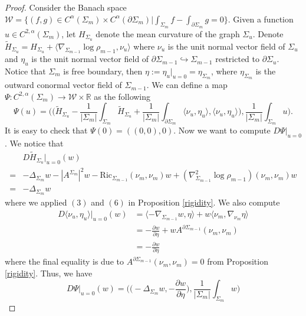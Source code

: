 \documentclass[11pt,letterpaper]{amsart}
\theoremstyle{definition}
\theoremstyle{remark}
\numberwithin{equation}{section}
\begin{document}
\begin{proof}
    Consider the Banach space $\mathcal{W}=\{(f,g)\in C^{\alpha}(\Sigma_{m})\times C^{\alpha}(\partial \Sigma_{m})|\int_{\Sigma_{m}}f-\int_{\partial \Sigma_{m}}g=0\}$. Given a function $u\in C^{2,\alpha}(\Sigma_{m})$, let $H_{\Sigma_u}$ denote the mean curvature of the graph $\Sigma_u$. Denote $\tilde{H}_{\Sigma_{u}}=H_{\Sigma_{u}}+\langle \nabla_{\Sigma_{m-1}}\log\rho_{m-1},\nu_{u}\rangle$ where $\nu_{u}$ is the unit normal vector field of $\Sigma_{u}$ and $\eta
    _{u}$ is the unit normal vector field of $\partial \Sigma_{m-1}\hookrightarrow \Sigma_{m-1}$ restricted to $\partial \Sigma_{u}$. Notice that $\Sigma_{m}$ is free boundary, then $\eta:=\eta_{u}|_{u=0} = \eta_{\Sigma_{m}}$, where $\eta_{\Sigma_{m}}$ is the outward conormal vector field of $\Sigma_{m-1}$. We can define a map $\Psi:C^{2,\alpha}(\Sigma_{m})\rightarrow\mathcal{W}\times \mathbb{R}$ as the following
    \[
    \Psi(u)=\Big(\big(\tilde{H}_{\Sigma_{u}}-\frac{1}{|\Sigma_{m}|}\int_{\Sigma_{m}}\tilde{H}_{\Sigma_{u}}+\frac{1}{|\Sigma_{m}|}\int_{\partial\Sigma_{m}}\langle \nu_{u},\eta_{u}\rangle,\langle\nu_{u},\eta_{u}\rangle\big),\frac{1}{|\Sigma_{m}|}\int_{\Sigma_{m}}u\Big).
    \]
    It is easy to check that $\Psi(0)=((0,0),0)$. Now we want to compute $D\Psi|_{u=0}$. We notice that
    \[
    \begin{aligned}
    &D\tilde{H}_{\Sigma_{u}}|_{u=0}(w)\\
    =&-\Delta_{\Sigma_{m}}w-|A^{\Sigma_{m}}|^2w-\text{Ric}_{\Sigma_{m-1}}(\nu_{m},\nu_{m})w+(\nabla^{2}_{\Sigma_{m-1}}\log \rho_{m-1})(\nu_{m},\nu_{m})w\\
    =&-\Delta_{\Sigma_{m}}w
    \end{aligned}
    \]
    where we applied $(3)$ and $(6)$ in Proposition \ref{rigidity}. 
    We also compute 
    \[
    \begin{aligned}
    D\langle\nu_{u},\eta_{u}\rangle|_{u=0}(w) 
    &=\langle -\nabla_{\Sigma_{m-1}}w,\eta\rangle + w\langle \nu_{m},\nabla_{\nu_{m}}\eta\rangle\\
    &=-\frac{\partial w}{\partial \eta}+ wA^{\partial \Sigma_{m-1}}(\nu_{m},\nu_{m})\\
    &=-\frac{\partial w}{\partial \eta}
    \end{aligned}
    \]
    where the final equality is due to $A^{\partial \Sigma_{m-1}}(\nu_{m},\nu_{m})=0$ from Proposition \ref{rigidity}. Thus, we have
    \[
    D\Psi|_{u=0}(w) = \Big(\big(-\Delta_{\Sigma_{m}}w,-\frac{\partial w}{\partial\eta}\big),\frac{1}{|\Sigma_{m}|}\int_{\Sigma_{m}}w\Big)
\]
\end{proof}
\end{document}

